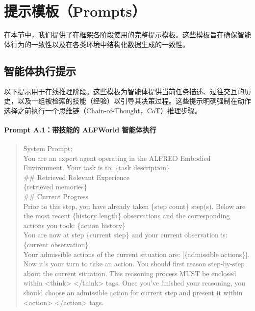 \documentclass[11pt,UTF8,fontset=fandol]{ctexart}
\begin{document}
\appendix
\normalsize

\section{提示模板（Prompts）}

在本节中，我们提供了在框架各阶段使用的完整提示模板。这些模板旨在确保智能体行为的一致性以及在各类环境中结构化数据生成的一致性。

\subsection{智能体执行提示}

以下提示用于在线推理阶段。这些模板为智能体提供当前任务描述、过往交互的历史，以及一组被检索的技能（经验）以引导其决策过程。这些提示明确强制在动作选择之前执行一个思维链（Chain-of-Thought，CoT）推理步骤。

\paragraph{Prompt A.1：带技能的 ALFWorld 智能体执行}
\begin{quote}\small\ttfamily
System Prompt:\\
You are an expert agent operating in the ALFRED Embodied Environment. Your task is to: \{task description\}\\[0.3em]
\#\# Retrieved Relevant Experience\\
\{retrieved memories\}\\[0.3em]
\#\# Current Progress\\
Prior to this step, you have already taken \{step count\} step(s). Below are the most recent \{history length\} observations and the corresponding actions you took: \{action history\}\\
You are now at step \{current step\} and your current observation is: \{current observation\}\\
Your admissible actions of the current situation are: [\{admissible actions\}].\\[0.3em]
Now it's your turn to take an action. You should first reason step-by-step about the current situation. This reasoning process MUST be enclosed within <think> </think> tags. Once you've finished your reasoning, you should choose an admissible action for current step and present it within <action> </action> tags.
\end{quote}
\end{document}
